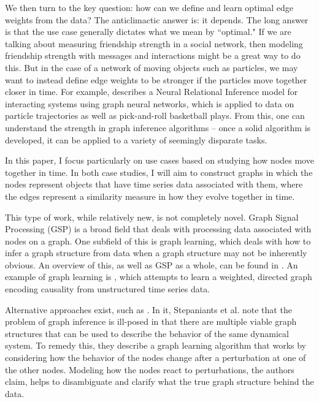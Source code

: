 \documentclass{article}
\theoremstyle{definition}
\begin{document}
We then turn to the key question: how can we define and learn optimal edge weights from the data? The anticlimactic answer is: it depends. The long answer is that the use case generally dictates what we mean by ``optimal." If we are talking about measuring friendship strength in a social network, then modeling friendship strength with messages and interactions might be a great way to do this. But in the case of a network of moving objects such as particles, we may want to instead define edge weights to be stronger if the particles move together closer in time. For example, \cite{kipf2018NRI} describes a Neural Relational Inference model for interacting systems using graph neural networks, which is applied to data on particle trajectories as well as pick-and-roll basketball plays. From this, one can understand the strength in graph inference algorithms -- once a solid algorithm is developed, it can be applied to a variety of seemingly disparate tasks.

In this paper, I focus particularly on use cases based on studying how nodes move together in time. In both case studies, I will aim to construct graphs in which the nodes represent objects that have time series data associated with them, where the edges represent a similarity measure in how they evolve together in time. 

This type of work, while relatively new, is not completely novel. Graph Signal Processing (GSP) is a broad field that deals with processing data associated with nodes on a graph. One subfield of this is graph learning, which deals with how to infer a graph structure from data when a graph structure may not be inherently obvious. An overview of this, as well as GSP as a whole, can be found in \cite{gspOverview}. An example of graph learning is \cite{causalModelingGraph}, which attempts to learn a weighted, directed graph encoding causality from unstructured time series data.

Alternative approaches exist, such as \cite{PhysRevInferringCausalNetworksPerturbations}. In it, Stepaniants et al. note that the problem of graph inference is ill-posed in that there are multiple viable graph structures that can be used to describe the behavior of the same dynamical system. To remedy this, they describe a graph learning algorithm that works by considering how the behavior of the nodes change after a perturbation at one of the other nodes. Modeling how the nodes react to perturbations, the authors claim, helps to disambiguate and clarify what the true graph structure behind the data.
\end{document}
